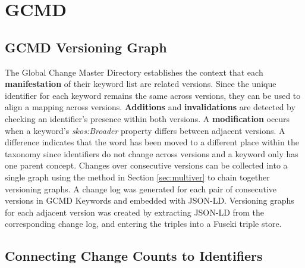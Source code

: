 \section{GCMD}

\subsection{GCMD Versioning Graph}

The Global Change Master Directory establishes the context that each \textbf{manifestation} of their keyword list are related versions.
Since the unique identifier for each keyword remains the same across versions, they can be used to align a mapping across versions.
\textbf{Additions} and \textbf{invalidations} are detected by checking an identifier's presence within both versions.
A \textbf{modification} occurs when a keyword's \textit{skos:Broader} property differs between adjacent versions.
A difference indicates that the word has been moved to a different place within the taxonomy since identifiers do not change across versions and a keyword only has one parent concept.
Changes over consecutive versions can be collected into a single graph using the method in Section \ref{sec:multiver} to chain together versioning graphs.
A change log was generated for each pair of consecutive versions in GCMD Keywords and embedded with JSON-LD.
Versioning graphs for each adjacent version was created by extracting JSON-LD from the corresponding change log, and entering the triples into a Fuseki triple store.

\subsection{Connecting Change Counts to Identifiers}

